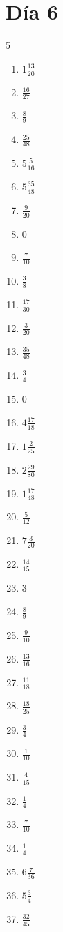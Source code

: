 \documentclass[12pt]{article}
\begin{document}
\section*{Día 6}
\begin{multicols}{5}\begin{enumerate}
\item $ 1 \frac{13}{20} $
\item $ \frac{16}{27} $
\item $ \frac{8}{9} $
\item $ \frac{25}{48} $
\item $ 5 \frac{5}{16} $
\item $ 5 \frac{35}{48} $
\item $ \frac{9}{20} $
\item $ 0 $
\item $ \frac{7}{10} $
\item $ \frac{3}{8} $
\item $ \frac{17}{30} $
\item $ \frac{3}{20} $
\item $ \frac{35}{48} $
\item $ \frac{3}{4} $
\item $ 0 $
\item $ 4 \frac{17}{18} $
\item $ 1 \frac{2}{25} $
\item $ 2 \frac{29}{80} $
\item $ 1 \frac{17}{48} $
\item $ \frac{5}{12} $
\item $ 7 \frac{3}{20} $
\item $ \frac{14}{15} $
\item $ 3 $
\item $ \frac{8}{9} $
\item $ \frac{9}{10} $
\item $ \frac{13}{16} $
\item $ \frac{11}{18} $
\item $ \frac{18}{25} $
\item $ \frac{3}{4} $
\item $ \frac{1}{10} $
\item $ \frac{4}{15} $
\item $ \frac{1}{4} $
\item $ \frac{7}{10} $
\item $ \frac{1}{4} $
\item $ 6 \frac{7}{36} $
\item $ 5 \frac{3}{4} $
\item $ \frac{32}{45} $

\end{enumerate}
\end{multicols}
\end{document}
